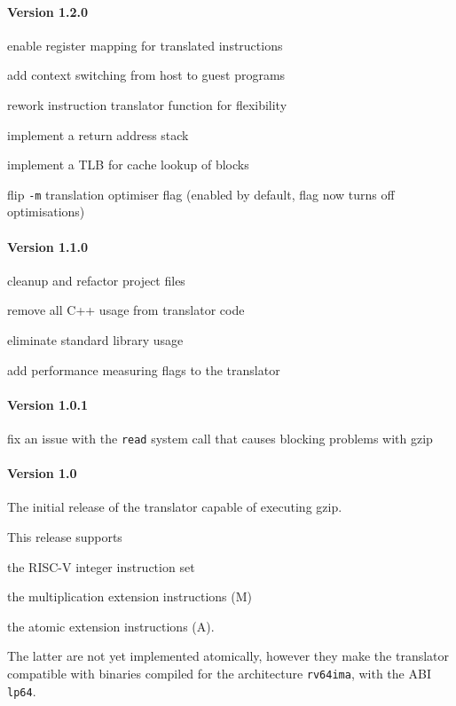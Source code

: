 \paragraph{Version 1.2.0}
\begin{itemize*}
 	\item enable register mapping for translated instructions
 	\item add context switching from host to guest programs
 	\item rework instruction translator function for flexibility
 	\item implement a return address stack
 	\item implement a TLB for cache lookup of blocks
 	\item flip \texttt{-m} translation optimiser flag (enabled by default, flag now turns off optimisations)
\end{itemize*}


\paragraph{Version 1.1.0}
\begin{itemize*}
 	\item cleanup and refactor project files
 	\item remove all C++ usage from translator code
 	\item eliminate standard library usage
 	\item add performance measuring flags to the translator
\end{itemize*}


\paragraph{Version 1.0.1}
\begin{itemize*}
 	\item fix an issue with the \texttt{read} system call that causes blocking problems with gzip
\end{itemize*}


\paragraph{Version 1.0}
The initial release of the translator capable of executing gzip.

This release supports
\begin{itemize*}
 	\item the RISC-V integer instruction set
 	\item the multiplication extension instructions (M)
 	\item the atomic extension instructions (A).
\end{itemize*}

The latter are not yet implemented atomically, however they make the translator compatible with binaries compiled for the architecture \texttt{rv64ima}, with the ABI \texttt{lp64}.



